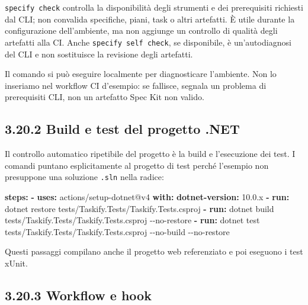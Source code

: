\documentclass[
  italian,
  10pt,
]{book}
\newenvironment{Shaded}{\begin{snugshade}}{\end{snugshade}}
\newcommand{\AttributeTok}[1]{\textcolor[rgb]{0.13,0.29,0.53}{#1}}
\newcommand{\FunctionTok}[1]{\textcolor[rgb]{0.13,0.29,0.53}{\textbf{#1}}}
\newcommand{\KeywordTok}[1]{\textcolor[rgb]{0.13,0.29,0.53}{\textbf{#1}}}
\newcommand{\StringTok}[1]{\textcolor[rgb]{0.31,0.60,0.02}{#1}}
\begin{document}
\texttt{specify\ check} controlla la disponibilità degli strumenti e dei
prerequisiti richiesti dal CLI; non convalida specifiche, piani, task o
altri artefatti. È utile durante la configurazione dell'ambiente, ma non
aggiunge un controllo di qualità degli artefatti alla CI. Anche
\texttt{specify\ self\ check}, se disponibile, è un'autodiagnosi del CLI
e non sostituisce la revisione degli artefatti.

Il comando si può eseguire localmente per diagnosticare l'ambiente. Non
lo inseriamo nel workflow CI d'esempio: se fallisce, segnala un problema
di prerequisiti CLI, non un artefatto Spec Kit non valido.

\subsection{3.20.2 Build e test del progetto
.NET}\label{build-e-test-del-progetto-.net}

Il controllo automatico ripetibile del progetto è la build e
l'esecuzione dei test. I comandi puntano esplicitamente al progetto di
test perché l'esempio non presuppone una soluzione \texttt{.sln} nella
radice:

\begin{Shaded}
\begin{Highlighting}[]
\FunctionTok{steps}\KeywordTok{:}
\AttributeTok{  }\KeywordTok{{-} }\FunctionTok{uses}\KeywordTok{:}\AttributeTok{ actions/setup{-}dotnet@v4}
\AttributeTok{    }\FunctionTok{with}\KeywordTok{:}
\AttributeTok{      }\FunctionTok{dotnet{-}version}\KeywordTok{:}\AttributeTok{ }\StringTok{\textquotesingle{}10.0.x\textquotesingle{}}
\AttributeTok{  }\KeywordTok{{-} }\FunctionTok{run}\KeywordTok{:}\AttributeTok{ dotnet restore tests/Taskify.Tests/Taskify.Tests.csproj}
\AttributeTok{  }\KeywordTok{{-} }\FunctionTok{run}\KeywordTok{:}\AttributeTok{ dotnet build tests/Taskify.Tests/Taskify.Tests.csproj {-}{-}no{-}restore}
\AttributeTok{  }\KeywordTok{{-} }\FunctionTok{run}\KeywordTok{:}\AttributeTok{ dotnet test tests/Taskify.Tests/Taskify.Tests.csproj {-}{-}no{-}build {-}{-}no{-}restore}
\end{Highlighting}
\end{Shaded}

Questi passaggi compilano anche il progetto web referenziato e poi
eseguono i test xUnit.

\subsection{3.20.3 Workflow e hook}\label{workflow-e-hook}
\end{document}
